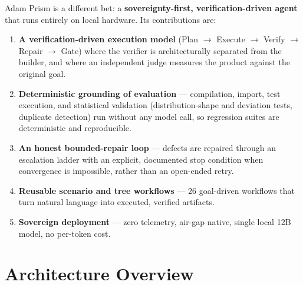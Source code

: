 \documentclass[11pt]{article}
\begin{document}
Adam Prism is a different bet: a \textbf{sovereignty-first, verification-driven agent}
that runs entirely on local hardware. Its contributions are:
\begin{enumerate}
  \item \textbf{A verification-driven execution model} (Plan
        $\rightarrow$ Execute $\rightarrow$ Verify $\rightarrow$ Repair
        $\rightarrow$ Gate) where the verifier is architecturally separated from the
        builder, and where an independent judge measures the product against the original
        goal.
  \item \textbf{Deterministic grounding of evaluation} --- compilation, import, test
        execution, and statistical validation (distribution-shape and deviation tests,
        duplicate detection) run without any model call, so regression suites are
        deterministic and reproducible.
  \item \textbf{An honest bounded-repair loop} --- defects are repaired through an
        escalation ladder with an explicit, documented stop condition when convergence is
        impossible, rather than an open-ended retry.
  \item \textbf{Reusable scenario and tree workflows} --- 26 goal-driven workflows that
        turn natural language into executed, verified artifacts.
  \item \textbf{Sovereign deployment} --- zero telemetry, air-gap native, single local
        12B model, no per-token cost.
\end{enumerate}

\section{Architecture Overview}\label{sec:arch}
\end{document}
